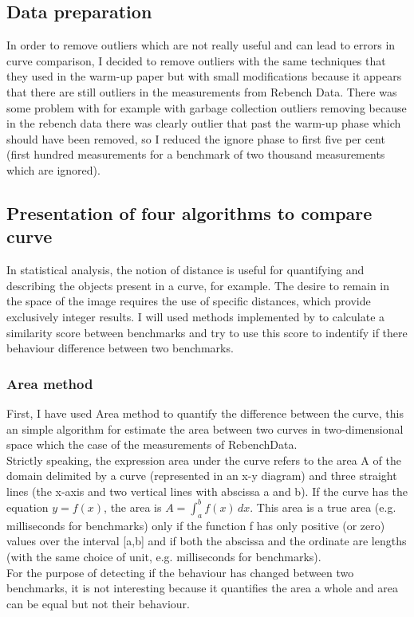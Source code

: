 \documentclass{article}
\begin{document}
\subsection{Data preparation}

In order to remove outliers which are not really useful and can lead to errors in curve comparison, I decided to remove outliers with the same techniques that they used in the warm-up paper but with small modifications because it appears that there are still outliers in the measurements from Rebench Data. There was some problem with for example with garbage collection outliers removing because in the rebench data there was clearly outlier that past the warm-up phase which should have been removed, so I reduced the ignore phase to first five per cent (first hundred measurements for a benchmark of two thousand measurements which are ignored).


\subsection{Presentation of four algorithms to compare curve}

In statistical analysis, the notion of distance is useful for quantifying and describing the objects present in
a curve, for example. The desire to remain in the space of the image requires the use of specific distances, which provide exclusively integer results. I will used methods implemented by \citep{jekel2019similarity} to calculate a similarity score between benchmarks and try to use this score to indentify if there behaviour difference between two benchmarks.

\subsubsection{Area method}

First, I have used Area \citep{jekel2019similarity} method to quantify the difference between the curve, this an simple algorithm for estimate the area between two curves in two-dimensional space which the case of the measurements of RebenchData.\\
Strictly speaking, the expression area under the curve refers to the area A of the domain delimited by a curve (represented in an x-y diagram) and three straight lines (the x-axis and two vertical lines with abscissa a and b). If the curve has the equation $y=f(x)$, the area is $A=\int _{a}^{b}f(x)\, {d} x$. This area is a true area (e.g. milliseconds for benchmarks) only if the function f has only positive (or zero) values over the interval [a,b] and if both the abscissa and the ordinate are lengths (with the same choice of unit, e.g. milliseconds for benchmarks).\\
For the purpose of detecting if the behaviour has changed between two benchmarks, it is not interesting because it quantifies the area a whole and area can be equal but not their behaviour.
\end{document}
